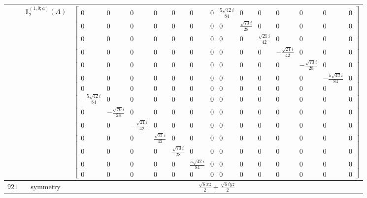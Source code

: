 \documentclass[fleqn,8pt,landscape]{jsarticle}
\begin{document}
\begin{longtable}{ccc}
$  $ & $ \mathbb{T}_{2}^{(1,0;a)}(A) $ & $ \begin{bmatrix} 0 & 0 & 0 & 0 & 0 & 0 & 0 & \frac{5 \sqrt{42} i}{84} & 0 & 0 & 0 & 0 & 0 & 0 \\ 0 & 0 & 0 & 0 & 0 & 0 & 0 & 0 & \frac{\sqrt{70} i}{28} & 0 & 0 & 0 & 0 & 0 \\ 0 & 0 & 0 & 0 & 0 & 0 & 0 & 0 & 0 & \frac{\sqrt{21} i}{42} & 0 & 0 & 0 & 0 \\ 0 & 0 & 0 & 0 & 0 & 0 & 0 & 0 & 0 & 0 & - \frac{\sqrt{21} i}{42} & 0 & 0 & 0 \\ 0 & 0 & 0 & 0 & 0 & 0 & 0 & 0 & 0 & 0 & 0 & - \frac{\sqrt{70} i}{28} & 0 & 0 \\ 0 & 0 & 0 & 0 & 0 & 0 & 0 & 0 & 0 & 0 & 0 & 0 & - \frac{5 \sqrt{42} i}{84} & 0 \\ 0 & 0 & 0 & 0 & 0 & 0 & 0 & 0 & 0 & 0 & 0 & 0 & 0 & 0 \\ - \frac{5 \sqrt{42} i}{84} & 0 & 0 & 0 & 0 & 0 & 0 & 0 & 0 & 0 & 0 & 0 & 0 & 0 \\ 0 & - \frac{\sqrt{70} i}{28} & 0 & 0 & 0 & 0 & 0 & 0 & 0 & 0 & 0 & 0 & 0 & 0 \\ 0 & 0 & - \frac{\sqrt{21} i}{42} & 0 & 0 & 0 & 0 & 0 & 0 & 0 & 0 & 0 & 0 & 0 \\ 0 & 0 & 0 & \frac{\sqrt{21} i}{42} & 0 & 0 & 0 & 0 & 0 & 0 & 0 & 0 & 0 & 0 \\ 0 & 0 & 0 & 0 & \frac{\sqrt{70} i}{28} & 0 & 0 & 0 & 0 & 0 & 0 & 0 & 0 & 0 \\ 0 & 0 & 0 & 0 & 0 & \frac{5 \sqrt{42} i}{84} & 0 & 0 & 0 & 0 & 0 & 0 & 0 & 0 \\ 0 & 0 & 0 & 0 & 0 & 0 & 0 & 0 & 0 & 0 & 0 & 0 & 0 & 0 \end{bmatrix} $ \\ \hline
$ 921 $ & $ \text{symmetry} $ & $ \frac{\sqrt{6} x z}{2} + \frac{\sqrt{6} i y z}{2} $ \\

\end{longtable}
\end{document}
